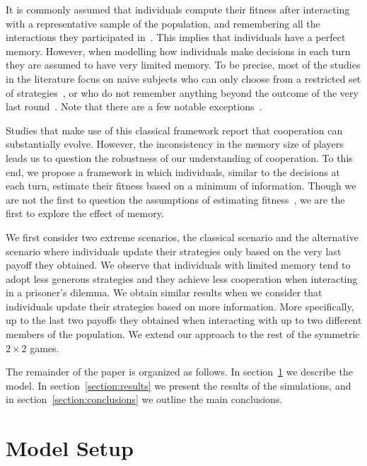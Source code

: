 \documentclass[11pt]{article}
\theoremstyle{plainCl1}
\theoremstyle{plainCl2}
\begin{document}
It is commonly assumed that individuals compute their fitness after interacting
with a representative sample of the population, and remembering all the
interactions they participated in~\cite{Nowak2006, nowak2004emergence,
Hilbe2013, Hilbe2018,Reiter2018, garcia2018no, Nowak1992tit, Baek2016}. This
implies that individuals have a perfect memory. However, when modelling how
individuals make decisions in each turn they are assumed to have very limited
memory. To be precise, most of the studies in the literature focus on naive
subjects who can only choose from a restricted set of
strategies~\cite{Nowak1992tit}, or who do not remember anything beyond the
outcome of the very last round~\cite{Baek2016}. Note that there are a few
notable exceptions~\cite{Hauert1997, Stewart2016}.

Studies that make use of this classical framework report that cooperation can
substantially evolve. However, the inconsistency in the memory size of players
leads us to question the robustness of our understanding of cooperation. To this end, we
propose a framework in which individuals, similar to the decisions at each turn,
estimate their fitness based on a minimum of information. Though we are not the
first to question the assumptions of estimating fitness~\cite{Roca2006}, we are
the first to explore the effect of memory.

We first consider two extreme scenarios, the classical scenario
and the alternative scenario where individuals update their strategies
only based on the very last payoff they obtained. We observe that individuals 
with limited memory tend to adopt less generous strategies and they achieve less
cooperation when interacting in a prisoner's dilemma. We obtain similar results when we
consider that individuals update their strategies based on more
information. More specifically, up to the last two payoffs they obtained when
interacting with up to two different members of the population. We extend our
approach to the rest of the symmetric \(2 \times 2\) games.

The remainder of the paper is organized as follows. In
section~\ref{section:model} we describe the model. In
section~\ref{section:results} we present the results of the simulations, and
in section~\ref{section:conclusions} we outline the main conclusions.

\section{Model Setup}\label{section:model}
\end{document}
